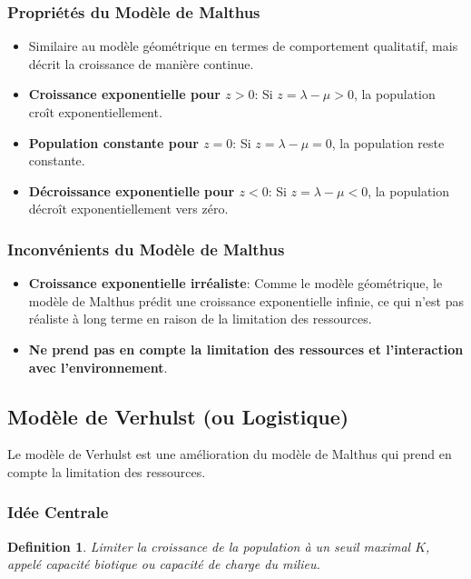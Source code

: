 \documentclass{article}
\newtheorem{definition}{Definition}
\begin{document}
\subsubsection{Propriétés du Modèle de Malthus}
\begin{itemize}
    \item Similaire au modèle géométrique en termes de comportement qualitatif, mais décrit la croissance de manière continue.
    \item \textbf{Croissance exponentielle pour $z > 0$}: Si $z = \lambda - \mu > 0$, la population croît exponentiellement.
    \item \textbf{Population constante pour $z = 0$}: Si $z = \lambda - \mu = 0$, la population reste constante.
    \item \textbf{Décroissance exponentielle pour $z < 0$}: Si $z = \lambda - \mu < 0$, la population décroît exponentiellement vers zéro.
\end{itemize}

\subsubsection{Inconvénients du Modèle de Malthus}

\begin{itemize}
    \item \textbf{Croissance exponentielle irréaliste}: Comme le modèle géométrique, le modèle de Malthus prédit une croissance exponentielle infinie, ce qui n'est pas réaliste à long terme en raison de la limitation des ressources.
    \item \textbf{Ne prend pas en compte la limitation des ressources et l'interaction avec l'environnement}.
\end{itemize}

\subsection{Modèle de Verhulst (ou Logistique)}

Le modèle de Verhulst est une amélioration du modèle de Malthus qui prend en compte la limitation des ressources.

\subsubsection{Idée Centrale}
\begin{definition}
Limiter la croissance de la population à un seuil maximal $K$, appelé \textit{capacité biotique} ou \textit{capacité de charge} du milieu.
\end{definition}
\end{document}
